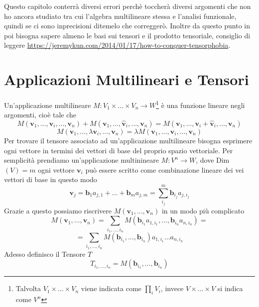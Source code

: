 \documentclass[11pt,a4paper]{report}
\newcommand{\vettore}[1]{\mathbf{#1}}
\theoremstyle{definition}
\theoremstyle{plain}
\theoremstyle{plain}
\begin{document}
		Questo capitolo conterrà diversi errori perchè toccherà diversi argomenti che non ho ancora studiato tra cui l'algebra multilineare stessa e l'analisi funzionale, quindi se ci sono inprecisioni ditemelo che correggerò.\newline
		Inoltre da questo punto in poi bisogna sapere almeno le basi sui tensori e il prodotto tensoriale, consiglio di leggere \href{url}{https://jeremykun.com/2014/01/17/how-to-conquer-tensorphobia}.

		\section{Applicazioni Multilineari e Tensori}
			Un'applicazione multilineare $M:V_1\times\dots\times V_n\rightarrow W$\footnote{Talvolta $V_1\times\dots\times V_n$ viene indicata come $\prod_i V_i$, invece $V\times\dots\times V$ si indica come $V^n$} è una funzione lineare negli argomenti, cioè tale che
			\[
				M(\vettore v_1,\dots,\vettore v_i,\dots,\vettore v_n)+M(\vettore v_1,\dots,\vettore{\hat v}_i,\dots,\vettore v_n)=
				M(\vettore v_1,\dots,\vettore v_i+\vettore{\hat v}_i,\dots,\vettore v_n)
			\]
			\begin{equation}
				M(\vettore v_1,\dots,\lambda \vettore v_i,\dots,\vettore v_n)=
				\lambda M(\vettore v_1,\dots,\vettore v_i,\dots,\vettore v_n)
			\end{equation}
			Per trovare il tensore associato ad un'applicazione multilineare bisogna esprimere ogni vettore in termini dei vettori di base del proprio spazio vettoriale.\newline
			Per semplicità prendiamo un'applicazione multinineare $M:V^n\rightarrow W$, dove Dim$(V)=m$\newline
			ogni vettore $\vettore v_i$ può essere scritto come combinazione lineare dei vei vettori di base in questo modo 
			\[
				\vettore v_j=\vettore b_1 a_{j,1}+\dots +\vettore b_m a_{j,m}=\sum_{i_j}^m\vettore b_{i_j}a_{j,i_j}
			\]
			Grazie a questo possiamo riscrivere $M(\vettore v_1,\dots,\vettore v_n)$ in un modo più complicato\newline
			\[
				M(\vettore v_1,\dots,\vettore v_n)=
				\sum_{i_1,\dots,i_n}M(\vettore b_{i_1}  a_{1,{i_1}},\dots,\vettore b_{i_n} a_{n,{i_n}})=
			\]
			\[
				=\sum_{i_1,\dots,i_n}M(\vettore b_{i_1},\dots,\vettore b_{i_n})a_{1,{i_1}}\dots a_{n,{i_n}}
			\]
			Adesso definisco il Tensore $T$
			\begin{equation}
				T_{i_1,\dots,i_n}=M(\vettore b_{i_1},\dots,\vettore b_{i_n})
			\end{equation}
\end{document}
